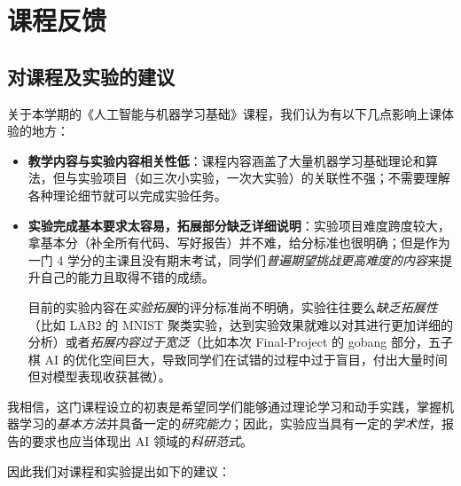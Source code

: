 \documentclass[oneside]{ctexbook}
\begin{document}
\chapter{课程反馈} \label{chap:feedback}

\section{对课程及实验的建议}

关于本学期的《人工智能与机器学习基础》课程，我们认为有以下几点影响上课体验的地方：

\begin{itemize}
    \item \textbf{教学内容与实验内容相关性低}：课程内容涵盖了大量机器学习基础理论和算法，但与实验项目（如三次小实验，一次大实验）的关联性不强；不需要理解各种理论细节就可以完成实验任务。
    \item \textbf{实验完成基本要求太容易，拓展部分缺乏详细说明}：实验项目难度跨度较大，拿基本分（补全所有代码、写好报告）并不难，给分标准也很明确；但是作为一门 4 学分的主课且没有期末考试，同学们\textit{普遍期望挑战更高难度的内容}来提升自己的能力且取得不错的成绩。
    
    目前的实验内容在\textit{实验拓展}的评分标准尚不明确，实验往往要么\textit{缺乏拓展性}（比如 LAB2 的 MNIST 聚类实验，达到实验效果就难以对其进行更加详细的分析）或者\textit{拓展内容过于宽泛}（比如本次 Final-Project 的 gobang 部分，五子棋 AI 的优化空间巨大，导致同学们在试错的过程中过于盲目，付出大量时间但对模型表现收获甚微）。
\end{itemize}

我相信，这门课程设立的初衷是希望同学们能够通过理论学习和动手实践，掌握机器学习的\textit{基本方法}并具备一定的\textit{研究能力}；因此，实验应当具有一定的\textit{学术性}，报告的要求也应当体现出 AI 领域的\textit{科研范式}。

因此我们对课程和实验提出如下的建议：
\end{document}
